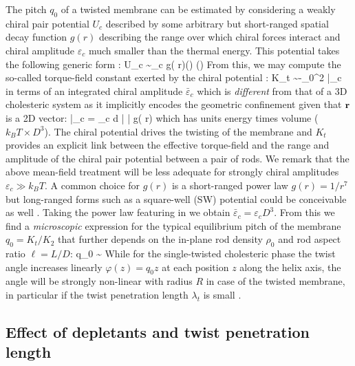 The pitch $q_{0}$ of a twisted membrane can be estimated by considering a weakly chiral pair potential $U_{c}$ described by some arbitrary but short-ranged spatial decay function $g(r)$ describing the range over which chiral forces interact and chiral amplitude $\varepsilon_{c} $ much smaller than the thermal energy. This potential takes the following generic form \cite{goossens71}:
\beq
U_{c} \sim  \varepsilon_{c} g( r)(\bwa \times \bwb \cdot   \bx) (\bwa \cdot \bwb)
\label{uchi}
\eeq
From this, we may compute the so-called torque-field constant exerted by the chiral potential \cite{wensink2018elastic}:
\beq
K_{t}   \sim -\rho_{0}^{2}  \bar{\varepsilon}_{c} 
\eeq
in terms of an integrated chiral amplitude  $\bar{\varepsilon}_{c}$ which is  {\em different} from that of a  3D cholesteric system as it implicitly encodes the geometric confinement given that ${\bf r}$ is a 2D vector:
\beq
 \bar{\varepsilon}_{c}  =  \varepsilon_{c} \int d \bdr | \bdr \cdot \bx |    g( r)
 \eeq
 which has units energy times volume ($k_{B}T \times D^{3}$). The chiral potential drives the twisting of the membrane and $K_{t}$  provides an explicit link between the effective torque-field and the range and amplitude  of the chiral pair potential between a pair of  rods. We remark that the above mean-field treatment will be less adequate for strongly chiral amplitudes $\varepsilon_{c} \gg k_{B}T$. A common choice for $g(r)$ is a short-ranged power law $g(r) = 1/r^{7}$ but  long-ranged forms such as a square-well (SW) potential could be conceivable as well \cite{Wensink2009}. Taking the power law featuring in  we obtain $\bar{\varepsilon}_{c} = \varepsilon_{c} D^{3}$.  From this we find a {\em microscopic} expression for the typical equilibrium  pitch of the membrane $q_{0} = K_{t}/K_{2}$ that further depends on the in-plane rod density $\rho_{0}$ and rod aspect ratio $\ell = L/D$:
 \beq
 q_{0} \sim {}
 \label{qzero}
 \eeq
 While for the single-twisted cholesteric phase the twist angle increases linearly  $\varphi(z) = q_{0} z$ at each position $z$ along the helix axis, the angle will be strongly non-linear with radius $R$ in case of the twisted membrane, in particular if the twist penetration length $\lambda_{t}$ is small \cite{wensink2018elastic}.   
 


\subsection{Effect of depletants and twist penetration length}

